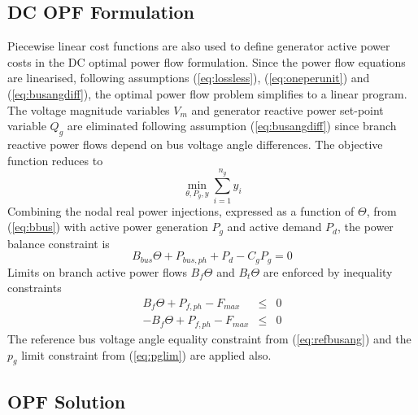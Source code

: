\subsection{DC OPF Formulation}
Piecewise linear cost functions are also used to define generator active power
costs in the DC optimal power flow formulation.  Since the power flow equations
are linearised, following assumptions (\ref{eq:lossless}), (\ref{eq:oneperunit})
and (\ref{eq:busangdiff}), the optimal power flow problem simplifies to a
linear program.  The voltage magnitude variables $V_m$ and generator reactive
power set-point variable $Q_g$ are eliminated following assumption
(\ref{eq:busangdiff}) since branch reactive power flows depend on bus voltage
angle differences.  The objective function reduces to
\begin{equation}
\min_{\theta, P_g, y} \sum_{i=1}^{n_g}y_i
\end{equation}
Combining the nodal real power injections, expressed as a function of $\Theta$,
from (\ref{eq:bbus}) with active power generation $P_g$ and active demand $P_d$,
the power balance constraint is
\begin{equation}
B_{bus}\Theta + P_{bus,ph} + P_d - C_gP_g = 0
\end{equation}
Limits on branch active power flows $B_f\Theta$ and $B_t\Theta$ are enforced by
inequality constraints
\begin{eqnarray}
B_f\Theta + P_{f,ph} - F_{max}& \leq& 0\\
-B_f\Theta + P_{f,ph} - F_{max}& \leq& 0
\end{eqnarray}
The reference bus voltage angle equality constraint from (\ref{eq:refbusang})
and the $p_g$ limit constraint from (\ref{eq:pglim}) are applied also.

\subsection{OPF Solution}
\label{sec:opfsol}

